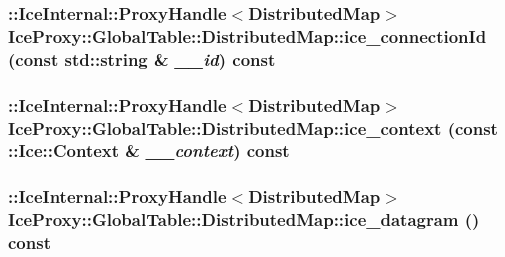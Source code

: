 \label{class_ice_proxy_1_1_global_table_1_1_distributed_map_ad4bfc3a8b1293b049906916cacb821db}
\hypertarget{class_ice_proxy_1_1_global_table_1_1_distributed_map_a5a368d40812f656a7c93e305707ac40f}{
\subsubsection[{ice\_\-connectionId}]{\setlength{\rightskip}{0pt plus 5cm}::IceInternal::ProxyHandle$<${\bf DistributedMap}$>$ IceProxy::GlobalTable::DistributedMap::ice\_\-connectionId (const std::string \& {\em \_\-\_\-id}) const}}
\label{class_ice_proxy_1_1_global_table_1_1_distributed_map_a5a368d40812f656a7c93e305707ac40f}
\hypertarget{class_ice_proxy_1_1_global_table_1_1_distributed_map_a6590a666cda810e05f7bffbfc0319384}{
\subsubsection[{ice\_\-context}]{\setlength{\rightskip}{0pt plus 5cm}::IceInternal::ProxyHandle$<${\bf DistributedMap}$>$ IceProxy::GlobalTable::DistributedMap::ice\_\-context (const ::Ice::Context \& {\em \_\-\_\-context}) const}}
\label{class_ice_proxy_1_1_global_table_1_1_distributed_map_a6590a666cda810e05f7bffbfc0319384}
\hypertarget{class_ice_proxy_1_1_global_table_1_1_distributed_map_ac4681d7d3ef795e9ebff8c3de27a2689}{
\subsubsection[{ice\_\-datagram}]{\setlength{\rightskip}{0pt plus 5cm}::IceInternal::ProxyHandle$<${\bf DistributedMap}$>$ IceProxy::GlobalTable::DistributedMap::ice\_\-datagram () const}}
